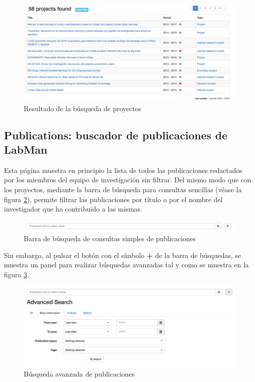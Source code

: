 \begin{figure}[!htbp]
	\centering
	\includegraphics[scale=0.31]{fig/projects_search_result}
	\caption{Resultado de la búsqueda de proyectos}
	\label{fig:projects_search_result}
\end{figure}

\subsection{Publications: buscador de publicaciones de LabMan}

Esta página muestra en principio la lista de todos las publicaciones redactados por los miembros del equipo de investigación sin filtrar. Del mismo modo que con los proyectos, mediante la barra de búsqueda para consultas sencillas (véase la figura \ref{fig:publication_search_bar}), permite filtrar las publicaciones por título o por el nombre del investigador que ha contribuido a las mismas.

\begin{figure}[!htbp]
	\centering
	\includegraphics[scale=0.35]{fig/publication_search_bar}
	\caption{Barra de búsqueda de consultas simples de publicaciones}
	\label{fig:publication_search_bar}
\end{figure}

Sin embargo, al pulsar el botón con el símbolo \textbf{+} de la barra de búsquedas, se muestra un panel para realizar búsquedas avanzadas tal y como se muestra en la figura \ref{fig:publications_advanced_search}.

\begin{figure}[!htbp]
	\centering
	\includegraphics[scale=0.7]{fig/publications_advanced_search}
	\caption{Búsqueda avanzada de publicaciones}
	\label{fig:publications_advanced_search}
\end{figure}


